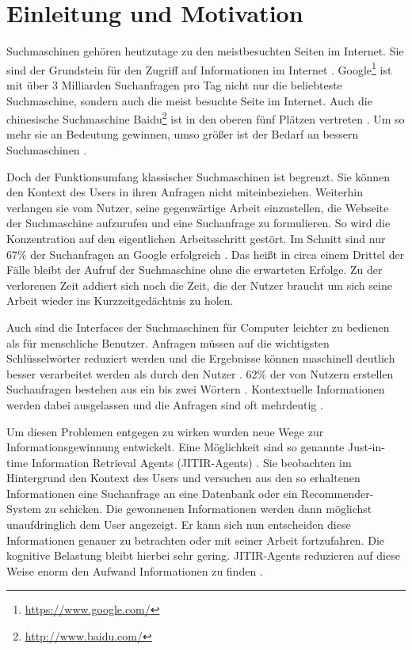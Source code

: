 \section{Einleitung und Motivation}
Suchmaschinen gehören heutzutage zu den meistbesuchten Seiten im Internet. Sie sind der Grundstein für den Zugriff auf Informationen im Internet \cite{budzik2000user}. Google\footnote{\url{https://www.google.com/}} ist mit über 3 Milliarden Suchanfragen pro Tag \cite{medium} nicht nur die beliebteste Suchmaschine, sondern auch die meist besuchte Seite im Internet. Auch die chinesische Suchmaschine Baidu\footnote{\url{http://www.baidu.com/}} ist in den oberen fünf Plätzen vertreten \cite{alexa}. Um so mehr sie an Bedeutung gewinnen, umso größer ist der Bedarf an bessern Suchmaschinen \cite{lawrence2000context}.

Doch der Funktionsumfang klassischer Suchmaschinen ist begrenzt. Sie können den Kontext des Users in ihren Anfragen nicht miteinbeziehen. Weiterhin verlangen sie vom Nutzer, seine gegenwärtige Arbeit einzustellen, die Webseite der Suchmaschine aufzurufen und eine Suchanfrage zu formulieren. So wird die Konzentration auf den eigentlichen Arbeitsschritt gestört. Im Schnitt sind nur 67\% der Suchanfragen an Google erfolgreich \cite{winfuture}. Das heißt in circa einem Drittel der Fälle bleibt der Aufruf der Suchmaschine ohne die erwarteten Erfolge. Zu der verlorenen Zeit addiert sich noch die Zeit, die der Nutzer braucht um sich seine Arbeit wieder ins Kurzzeitgedächtnis zu holen.

Auch sind die Interfaces der Suchmaschinen für Computer leichter zu bedienen als für menschliche Benutzer. Anfragen müssen auf die wichtigsten Schlüsselwörter reduziert werden und die Ergebnisse können maschinell deutlich besser verarbeitet werden als durch den Nutzer \cite{budzik1999watson}. 62\% der von Nutzern erstellen Suchanfragen bestehen aus ein bis zwei Wörtern \cite{jansen2000real}. Kontextuelle Informationen werden dabei ausgelassen und die Anfragen sind oft mehrdeutig \cite{budzik1999watson}.

Um diesen Problemen entgegen zu wirken wurden neue Wege zur Informationsgewinnung entwickelt. Eine Möglichkeit sind so genannte Just-in-time Information Retrieval Agents (JITIR-Agents) \cite{rhodes2000thesis}. Sie beobachten im Hintergrund den Kontext des Users und versuchen aus den so erhaltenen Informationen eine Suchanfrage an eine Datenbank oder ein Recommender-System zu schicken. Die gewonnenen Informationen werden dann möglichst unaufdringlich dem User angezeigt. Er kann sich nun entscheiden diese Informationen genauer zu betrachten oder mit seiner Arbeit fortzufahren. Die kognitive Belastung bleibt hierbei sehr gering. JITIR-Agents reduzieren auf diese Weise enorm den Aufwand Informationen zu finden \cite{rhodes2000just}.

